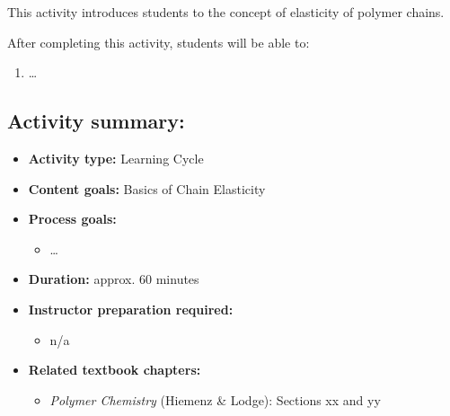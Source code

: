 %
%
%
%

\renewcommand{\figpath}{content/polymphys/chain-confs/chain-elasticity/figs}
\renewcommand{\labelbase}{chain-elasticity}

\begin{activity}

\begin{instructornotes}

	This activity introduces students to the concept of elasticity of polymer chains.
	
	After completing this activity, students will be able to:
			\begin{enumerate}
				\item \dots
			\end{enumerate}
	
			
	\subsection*{Activity summary:}
	\begin{itemize}
		\item \textbf{Activity type:} Learning Cycle
		\item \textbf{Content goals:} Basics of Chain Elasticity
		\item \textbf{Process goals:} %
			\begin{itemize}
				\item \dots
			\end{itemize}
		\item \textbf{Duration:} approx. 60 minutes
		\item \textbf{Instructor preparation required:} 
			\begin{itemize}
				\item n/a
			\end{itemize}
		\item \textbf{Related textbook chapters:}
			\begin{itemize}
				\item \emph{Polymer Chemistry} (Hiemenz \& Lodge): Sections xx and yy
			\end{itemize}
	\end{itemize}


\end{instructornotes}
\end{activity}
